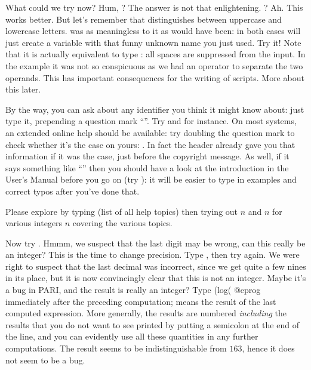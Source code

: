What could we try now? Hum, ? The answer is not that
enlightening. ? Ah. This works better. But let's remember that
 distinguishes between uppercase and lowercase letters.  was
as meaningless to it as  would have been: in both cases
 will just create a variable with that funny unknown name you just
used. Try it! Note that it is actually equivalent to type
: all spaces are suppressed from the input. In the
 example  it was not so conspicuous as we had an operator to
separate the two operands. This has important consequences for the writing of
 scripts. More about this later.

By the way, you can ask  about any identifier you think it might know
about: just type it, prepending a question mark ``''. Try 
and  for instance. On most systems, an extended online help should
be available: try doubling the question mark to check whether it's the case
on yours: . In fact the  header already gave you that
information if it was the case, just before the copyright message. As well,
if it says something like ``'' then you should have a
look at the  introduction in the User's Manual before you go
on (try ): it will be easier to type in examples and
correct typos after you've done that.

Please explore by typing  (list of all help topics) then trying out
$n$ and $n$ for various integers $n$ covering the various
topics.

Now try . Hmmm, we suspect that the last digit may
be wrong, can this really be an integer? This is the time to change
precision. Type , then try  again. We
were right to suspect that the last decimal was incorrect, since we get quite
a few nines in its place, but it is now convincingly clear that this is not
an integer. Maybe it's a bug in PARI, and the result is really an integer?
Type
\bprog
  (log(%
@eprog\noindent
immediately after the preceding computation; \kbd{\%} means the result of the
last computed expression. More generally, the results are numbered  \emph{including} the results
that you do not want to see printed by putting a semicolon at the end of the
line, and you can evidently use all these quantities in any further
computations. The result seems to be indistinguishable from $163$, hence it
does not seem to be a bug.

